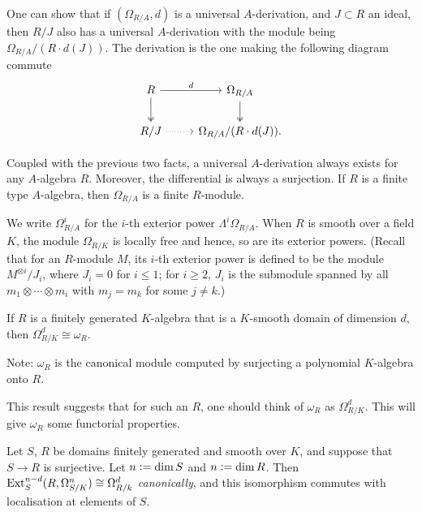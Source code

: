 \documentclass[12pt]{article}
\begin{document}
\begin{rem}
	One can show that if $(\Omega_{R/A}, d)$ is a universal $A$-derivation, and $J \subset R$ an ideal, then $R/J$ also has a universal $A$-derivation with the module being $\Omega_{R/A}/(R \cdot d(J))$. The derivation is the one making the following diagram commute
	\begin{equation*} 
		\begin{tikzcd}
			R \arrow[r, "d"] \arrow[d, two heads] & \Omega_{R/A} \arrow[d, two heads] \\
			R/J \arrow[r, dotted] & \Omega_{R/A}/(R \cdot d(J)).
		\end{tikzcd}
	\end{equation*}
\end{rem}

\begin{rem}
	Coupled with the previous two facts, a universal $A$-derivation always exists for any $A$-algebra $R$. Moreover, the differential is always a surjection. \newline
	If $R$ is a finite type $A$-algebra, then $\Omega_{R/A}$ is a finite $R$-module.
\end{rem}

We write $\Omega_{R/A}^{i}$ for the $i$-th exterior power $\Lambda^{i} \Omega_{R/A}$. When $R$ is smooth over a field $K$, the module $\Omega_{R/K}$ is locally free and hence, so are its exterior powers. (Recall that for an $R$-module $M$, its $i$-th exterior power is defined to be the module $M^{\otimes i}/J_{i}$, where $J_{i} = 0$ for $i \le 1$; for $i \ge 2$, $J_{i}$ is the submodule spanned by all $m_{1} \otimes \cdots \otimes m_{i}$ with $m_{j} = m_{k}$ for some $j \neq k$.)

\begin{thm}
	If $R$ is a finitely generated $K$-algebra that is a $K$-smooth domain of dimension $d$, then $\Omega_{R/K}^{d} \cong \omega_{R}$.
\end{thm}
Note: $\omega_{R}$ is the canonical module computed by surjecting a polynomial $K$-algebra onto $R$.

This result suggests that for such an $R$, one should think of $\omega_{R}$ as $\Omega_{R/K}^{d}$. This will give $\omega_{R}$ some functorial properties.

\begin{thm}
	Let $S$, $R$ be domains finitely generated and smooth over $K$, and suppose that $S \to R$ is surjective. Let $n \vcentcolon= \dim S$ and $n \vcentcolon= \dim R$. Then $\operatorname{Ext}_{S}^{n - d}(R, \Omega_{S/K}^{n}) \cong \Omega_{R/k}^{d}$ \emph{canonically}, and this isomorphism commutes with localisation at elements of $S$.
\end{thm}
\end{document}
